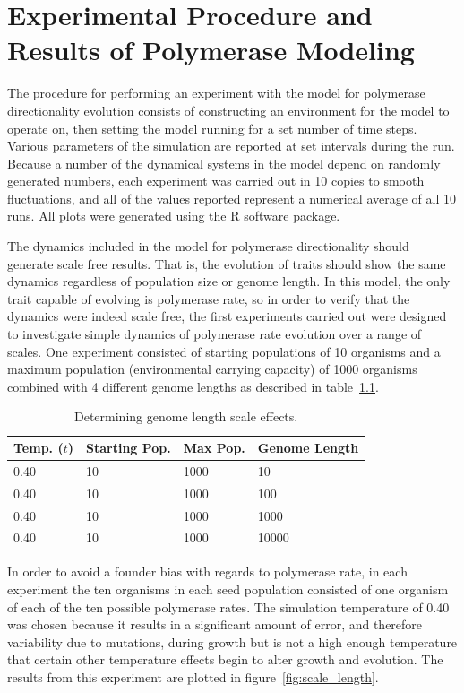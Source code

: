 \chapter{Experimental Procedure and Results of Polymerase Modeling} %
\label{cha:experimental_results_of_polymerase_modeling}
The procedure for performing an experiment with the model for polymerase directionality evolution consists of constructing an environment for the model to operate on, then setting the model running for a set number of time steps. Various parameters of the simulation are reported at set intervals during the run. Because a number of the dynamical systems in the model depend on randomly generated numbers, each experiment was carried out in 10 copies to smooth fluctuations, and all of the values reported represent a numerical average of all 10 runs. All plots were generated using the R software package\cite{Ihaka:1996p1018}.

The dynamics included in the model for polymerase directionality should generate scale free results. That is, the evolution of traits should show the same dynamics regardless of population size or genome length. In this model, the only trait capable of evolving is polymerase rate, so in order to verify that the dynamics were indeed scale free, the first experiments carried out were designed to investigate simple dynamics of polymerase rate evolution over a range of scales. One experiment consisted of starting populations of 10 organisms and a maximum population (environmental carrying capacity) of 1000 organisms combined with 4 different genome lengths as described in table~\ref{tab:scale_length}.

\begin{table}
	\begin{center}
		\begin{tabular}[c]{ l | l | l | l }
			Temp. ($t$) & Starting Pop. & Max Pop. & Genome Length \\
			\hline
			0.40 & 10 & 1000 & 10 \\
			0.40 & 10 & 1000 & 100 \\
			0.40 & 10 & 1000 & 1000 \\
			0.40 & 10 & 1000 & 10000 \\
		\end{tabular}
		\caption{Determining genome length scale effects.}
		\label{tab:scale_length}
	\end{center}
\end{table}

In order to avoid a founder bias with regards to polymerase rate, in each experiment the ten organisms in each seed population consisted of one organism of each of the ten possible polymerase rates. The simulation temperature of 0.40 was chosen because it results in a significant amount of error, and therefore variability due to mutations, during growth but is not a high enough temperature that certain other temperature effects begin to alter growth and evolution. The results from this experiment are plotted in figure~\ref{fig:scale_length}.


